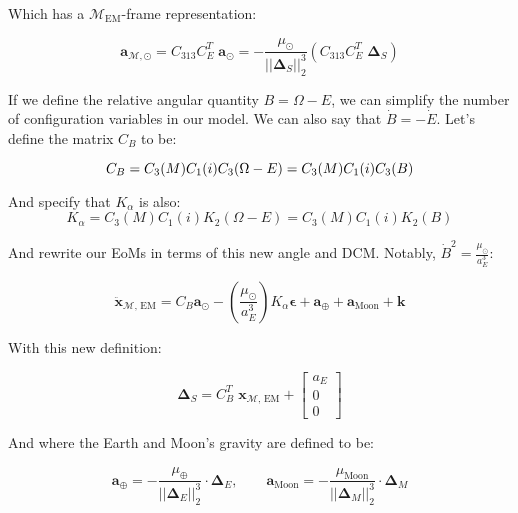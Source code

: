 \documentclass[]{article}
\newcommand{\norm}[1]{\left| \left| #1 \right| \right|_{2}}
\begin{document}
	Which has a $\mathcal{M}_\text{EM}$-frame representation:
	
	\begin{equation}
		\mathbf{a}_{\mathcal{M}, \odot} = C_\text{313} C_E^T \; \mathbf{a}_\odot = -\frac{\mu_\odot}{\norm{\boldsymbol{\Delta}_S}^3} \left( C_\text{313} C_E^T \; \boldsymbol{\Delta}_S \right)
	\end{equation}
	
	If we define the relative angular quantity $B = \Omega - E$, we can simplify the number of configuration variables in our model. We can also say that $\dot{B} = -\dot{E}$.  Let's define the matrix $C_B$ to be:
	
	\begin{equation}
		C_B = C_3(M) C_1(i) C_3(\Omega - E) = C_3(M) C_1(i) C_3(B) \\
	\end{equation}
	
	And specify that $K_\alpha$ is also:	
	\begin{equation}
		K_\alpha = C_3(M) C_1(i) K_2(\Omega - E) = C_3(M) C_1(i) K_2(B)
	\end{equation}
	
	And rewrite our EoMs in terms of this new angle and DCM.  Notably, $\dot{B}^2 = \frac{\mu_\odot}{a_E^3}$:
	
	\begin{equation}
		\ddot{\mathbf{x}}_{\mathcal{M}\text{, EM}} = C_B \mathbf{a}_\odot - \left(\frac{\mu_\odot}{a_E^3}\right) K_\alpha \boldsymbol{\epsilon} + \mathbf{a}_\oplus +  \mathbf{a}_\text{Moon}  + \mathbf{k}
	\end{equation}
	
	With this new definition:
	
	\begin{equation}
		\boldsymbol{\Delta}_S = C_B^T \; \mathbf{x}_{\mathcal{M}\text{, EM}} + \begin{bmatrix}
			a_E \\ 0 \\ 0
		\end{bmatrix}
	\end{equation}
	
	And where the Earth and Moon's gravity are defined to be:
	
	\begin{equation*}
		\mathbf{a}_\oplus = -\frac{\mu_\oplus}{\norm{\boldsymbol{\Delta}_E}^3} \cdot \boldsymbol{\Delta}_E, \quad\quad 
		\mathbf{a}_\text{Moon} = -\frac{\mu_\text{Moon}}{\norm{\boldsymbol{\Delta}_M}^3} \cdot \boldsymbol{\Delta}_M
	\end{equation*}
	
\end{document}

